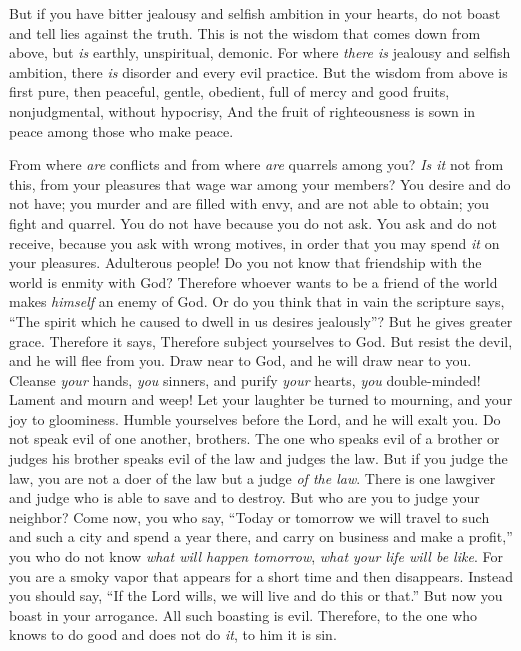 \begin{biblechapter}
\verse But if you have bitter jealousy and selfish ambition in your hearts, do not boast and tell lies against the truth.
\verse This is not the wisdom that comes down from above, but \textit{is} earthly, unspiritual, demonic.
\verse For where \textit{there is} jealousy and selfish ambition, there \textit{is} disorder and every evil practice.
\verse But the wisdom from above is first pure, then peaceful, gentle, obedient, full of mercy and good fruits, nonjudgmental, without hypocrisy,
\verse And the fruit of righteousness is sown in peace among those who make peace.
\end{biblechapter}

\begin{biblechapter} %
 From where \textit{are} conflicts and from where \textit{are} quarrels among you? \textit{Is it} not from this, from your pleasures that wage war among your members?
\verse You desire and do not have; you murder and are filled with envy, and are not able to obtain; you fight and quarrel. You do not have because you do not ask.
\verse You ask and do not receive, because you ask with wrong motives, in order that you may spend \textit{it} on your pleasures.
\verse Adulterous people! Do you not know that friendship with the world is enmity with God? Therefore whoever wants to be a friend of the world makes \textit{himself} an enemy of God.
\verse Or do you think that in vain the scripture says, “The spirit which he caused to dwell in us desires jealously”?
\verse But he gives greater grace. Therefore it says,
\verse Therefore subject yourselves to God. But resist the devil, and he will flee from you.
\verse Draw near to God, and he will draw near to you. Cleanse \textit{your} hands, \textit{you} sinners, and purify \textit{your} hearts, \textit{you} double-minded!
\verse Lament and mourn and weep! Let your laughter be turned to mourning, and your joy to gloominess.
\verse Humble yourselves before the Lord, and he will exalt you.
\verse Do not speak evil of one another, brothers. The one who speaks evil of a brother or judges his brother speaks evil of the law and judges the law. But if you judge the law, you are not a doer of the law but a judge \textit{of the law}.
\verse There is one lawgiver and judge who is able to save and to destroy. But who are you to judge your neighbor?
 Come now, you who say, “Today or tomorrow we will travel to such and such a city and spend a year there, and carry on business and make a profit,”
\verse you who do not know \textit{what will happen tomorrow}, \textit{what your life will be like}. For you are a smoky vapor that appears for a short time and then disappears.
\verse Instead you should say, “If the Lord wills, we will live and do this or that.”
\verse But now you boast in your arrogance. All such boasting is evil.
\verse Therefore, to the one who knows to do good and does not do \textit{it}, to him it is sin.
\end{biblechapter}

